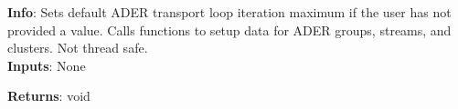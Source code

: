 \textbf{Info}: Sets default ADER transport loop iteration maximum if the user
has not provided a value. Calls functions to setup data for ADER groups, 
streams, and clusters. Not thread safe. \\

\noindent \textbf{Inputs}: None

\noindent \textbf{Returns}: void
